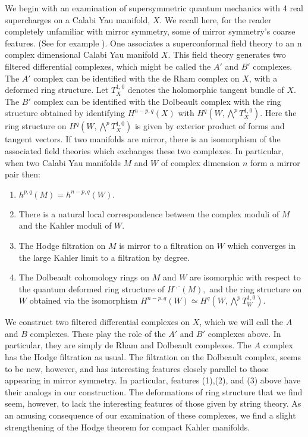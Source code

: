\documentclass[a4paper,11pt]{amsart}
\begin{document}
 
We begin with an examination of supersymmetric quantum mechanics with 4 real
 supercharges 
on a Calabi Yau manifold, $X$. 
We recall here, for the reader completely unfamiliar with mirror symmetry, some of
 mirror symmetry's coarse features. (See for example \cite{CK}).  
One associates a superconformal field theory to an n complex dimensional 
Calabi Yau manifold $X$. This
field theory generates two filtered 
differential complexes, which might be called the $A'$ and $B'$ complexes. The
$A'$ 
complex can be identified with the de Rham complex on $X$, with a deformed ring
 structure. Let $T_X^{1,0}$ denotes the holomorphic tangent bundle of $X$. The 
 $B'$ 
 complex can be identified with the Dolbeault complex with the ring structure
  obtained by identifying $H^{n-p,q}(X)$ with $H^q(W,\bigwedge^pT_X^{1,0}).$ Here 
  the ring structure on $H^q(W,\bigwedge^pT_X^{1,0})$ is
given by exterior product of forms and tangent vectors. 
If two manifolds are mirror, there is an isomorphism of the associated field
theories which exchanges these two complexes. In particular, when two 
Calabi Yau manifolds $M$ and $W$ of complex dimension $n$ form a mirror pair
 then: 
\begin{enumerate}
\item $h^{p,q}(M) = h^{n-p,q}(W).$
\item  There is a natural local correspondence between the complex moduli of $M$
and the Kahler moduli of $W$.
\item The Hodge filtration on $M$ is mirror to a filtration on $W$ which
converges in the large Kahler limit to a filtration by degree. 
\item The Dolbeault cohomology rings on $M$ and $W$ are isomorphic with 
respect to the quantum deformed ring structure of
$H^{\cdot,\cdot}(M),$ and the ring structure on $W$ obtained via the
isomorphism $H^{n-p,q}(W)\simeq H^q(W,\bigwedge^pT_W^{1,0}).$
\end{enumerate} 
We construct two filtered differential complexes on $X$,
which we will call the $A$ and $B$ complexes. These play the role of the 
$A'$ and $B'$ complexes above. In particular, they are simply de Rham and 
Dolbeault complexes. The $A$ complex has the Hodge filtration as usual. The 
filtration on the Dolbeault complex, seems to be new, however, and has 
interesting features closely parallel to those appearing in mirror
symmetry. In particular, features (1),(2), and (3) above have their analogs in
our construction. The deformations of ring structure that we find seem, however, to lack 
the interesting features of those given by string theory. As an amusing 
consequence of our examination of these complexes, we find a slight
strengthening of the Hodge theorem for compact Kahler manifolds. 
\end{document}

